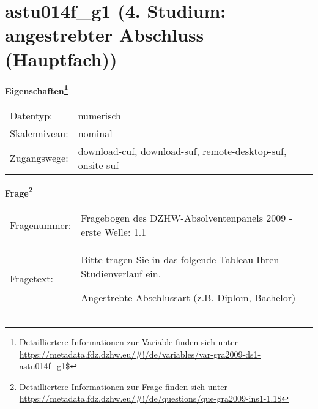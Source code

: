 
    \setcounter{footnote}{0}

    \vspace*{-1.8cm}
	\section{astu014f\_g1 (4. Studium: angestrebter Abschluss (Hauptfach))}
	\label{section:astu014f_g1}



    \vspace*{0.5cm}
    \noindent\textbf{Eigenschaften\footnote{Detailliertere Informationen zur Variable finden sich unter
		\url{https://metadata.fdz.dzhw.eu/\#!/de/variables/var-gra2009-ds1-astu014f_g1$}}}\\
	\begin{tabularx}{\hsize}{@{}lX}
	Datentyp: & numerisch \\
	Skalenniveau: & nominal \\
	Zugangswege: &
	  download-cuf, 
	  download-suf, 
	  remote-desktop-suf, 
	  onsite-suf
 \\
    \end{tabularx}



				\vspace*{0.5cm}
                \noindent\textbf{Frage\footnote{Detailliertere Informationen zur Frage finden sich unter
		              \url{https://metadata.fdz.dzhw.eu/\#!/de/questions/que-gra2009-ins1-1.1$}}}\\
				\begin{tabularx}{\hsize}{@{}lX}
					Fragenummer: &
					  Fragebogen des DZHW-Absolventenpanels 2009 - erste Welle:
					  1.1
 \\
					Fragetext: & Bitte tragen Sie in das folgende Tableau Ihren Studienverlauf ein.\par  Angestrebte Abschlussart (z.B. Diplom, Bachelor) \\
				\end{tabularx}





